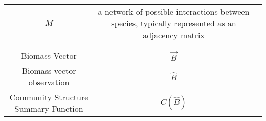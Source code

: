 \documentclass[]{article}
\begin{document}
\begin{longtable}[]{@{}ccl@{}}
\begin{minipage}[t]{0.23\columnwidth}
\(M\)\strut
\end{minipage} & \begin{minipage}[t]{0.42\columnwidth}\raggedright
a network of possible interactions between species, typically
represented as an adjacency matrix\strut
\end{minipage}\tabularnewline
\begin{minipage}[t]{0.25\columnwidth}\centering
\strut
\end{minipage} & \begin{minipage}[t]{0.23\columnwidth}\centering
\strut
\end{minipage} & \begin{minipage}[t]{0.42\columnwidth}\raggedright
\strut
\end{minipage}\tabularnewline
\begin{minipage}[t]{0.25\columnwidth}\centering
\strut
\end{minipage} & \begin{minipage}[t]{0.23\columnwidth}\centering
\strut
\end{minipage} & \begin{minipage}[t]{0.42\columnwidth}\raggedright
\strut
\end{minipage}\tabularnewline
\begin{minipage}[t]{0.25\columnwidth}\centering
Biomass Vector\strut
\end{minipage} & \begin{minipage}[t]{0.23\columnwidth}\centering
\(\vec{B}\)\strut
\end{minipage} & \begin{minipage}[t]{0.42\columnwidth}\raggedright
\strut
\end{minipage}\tabularnewline
\begin{minipage}[t]{0.25\columnwidth}\centering
Biomass vector observation\strut
\end{minipage} & \begin{minipage}[t]{0.23\columnwidth}\centering
\(\hat{B}\)\strut
\end{minipage} & \begin{minipage}[t]{0.42\columnwidth}\raggedright
\strut
\end{minipage}\tabularnewline
\begin{minipage}[t]{0.25\columnwidth}\centering
Community Structure Summary Function\strut
\end{minipage} & \begin{minipage}[t]{0.23\columnwidth}\centering
\(C(\hat{B})\)\strut
\end{minipage} & \begin{minipage}[t]{0.42\columnwidth}\raggedright

\end{minipage}
\end{longtable}
\end{document}
